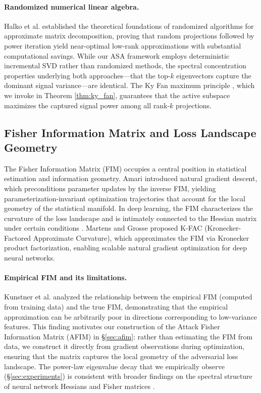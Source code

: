 ﻿\documentclass[lettersize,journal]{IEEEtran}
\begin{document}
\paragraph{Randomized numerical linear algebra.} Halko et al. \cite{halko2011finding} established the theoretical foundations of randomized algorithms for approximate matrix decomposition, proving that random projections followed by power iteration yield near-optimal low-rank approximations with substantial computational savings. While our ASA framework employs deterministic incremental SVD rather than randomized methods, the spectral concentration properties underlying both approaches---that the top-$k$ eigenvectors capture the dominant signal variance---are identical. The Ky Fan maximum principle \cite{fan1949theorem}, which we invoke in Theorem \ref{thm:ky_fan}, guarantees that the active subspace maximizes the captured signal power among all rank-$k$ projections.

\subsection{Fisher Information Matrix and Loss Landscape Geometry}
\label{sec:rw_fim}

The Fisher Information Matrix (FIM) occupies a central position in statistical estimation and information geometry. Amari \cite{amari1998natural} introduced natural gradient descent, which preconditions parameter updates by the inverse FIM, yielding parameterization-invariant optimization trajectories that account for the local geometry of the statistical manifold. In deep learning, the FIM characterizes the curvature of the loss landscape and is intimately connected to the Hessian matrix under certain conditions \cite{pascanu2014saddle}. Martens and Grosse \cite{martens2015optimizing} proposed K-FAC (Kronecker-Factored Approximate Curvature), which approximates the FIM via Kronecker product factorization, enabling scalable natural gradient optimization for deep neural networks.

\paragraph{Empirical FIM and its limitations.} Kunstner et al. \cite{kunstner2019limitations} analyzed the relationship between the empirical FIM (computed from training data) and the true FIM, demonstrating that the empirical approximation can be arbitrarily poor in directions corresponding to low-variance features. This finding motivates our construction of the Attack Fisher Information Matrix (AFIM) in \S\ref{sec:afim}: rather than estimating the FIM from data, we construct it directly from gradient observations during optimization, ensuring that the matrix captures the local geometry of the adversarial loss landscape. The power-law eigenvalue decay that we empirically observe (\S\ref{sec:experiments}) is consistent with broader findings on the spectral structure of neural network Hessians and Fisher matrices \cite{li2018visualizing}.
\end{document}
